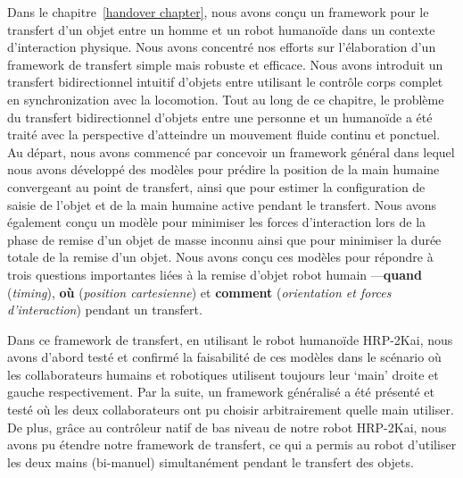 Dans le chapitre~\ref{handover chapter}, nous avons conçu un framework pour le transfert d'un objet entre un homme et un robot humanoïde dans un contexte d'interaction physique. Nous avons concentré nos efforts sur l'élaboration d'un framework de transfert simple mais robuste et efficace. Nous avons introduit un transfert bidirectionnel intuitif d'objets entre utilisant le contrôle corps complet en synchronization avec la locomotion. Tout au long de ce chapitre, le problème du transfert bidirectionnel d'objets entre une personne et un humanoïde a été traité avec la perspective d'atteindre un mouvement fluide continu et ponctuel. Au départ, nous avons commencé par concevoir un framework général dans lequel nous avons développé des modèles pour prédire la position de la main humaine convergeant au point de transfert, ainsi que pour estimer la configuration de saisie de l'objet et de la main humaine active pendant le transfert. Nous avons également conçu un modèle pour minimiser les forces d'interaction lors de la phase de remise d'un objet de masse inconnu ainsi que pour minimiser la durée totale de la remise d'un objet. Nous avons conçu ces modèles pour répondre à trois questions importantes liées à la remise d'objet robot humain ---\textbf{quand} (\textit{timing}), \textbf{où} (\textit{position cartesienne}) et \textbf{comment} (\textit{orientation et forces d'interaction}) pendant un transfert.




Dans ce framework de transfert, en utilisant le robot humanoïde HRP-2Kai, nous avons d'abord testé et confirmé la faisabilité de ces modèles dans le scénario où les collaborateurs humains et robotiques utilisent toujours leur `main' droite et gauche respectivement. Par la suite, un framework généralisé a été présenté et testé où les deux collaborateurs ont pu choisir arbitrairement quelle main utiliser. De plus, grâce au contrôleur natif de bas niveau de notre robot HRP-2Kai, nous avons pu étendre notre framework de transfert, ce qui a permis au robot d'utiliser les deux mains (bi-manuel) simultanément pendant le transfert des objets.


